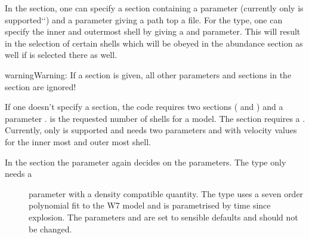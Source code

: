 \documentclass[letterpaper,10pt,english]{sphinxmanual}
\begin{document}
In the  section, one can specify a  section containing a  parameter
(currently only  is supported{}`{}`) and a  parameter giving a path top a file. For the  type,
one can specify the inner and outermost shell by giving a  and  parameter. This will result in
the selection of certain shells which will be obeyed in the abundance section as well if  is selected there as
well.

\begin{notice}{warning}{Warning:}
If a  section is given, all other parameters and sections in the  section are ignored!
\end{notice}

If one doesn't specify a  section, the code requires two sections ( and ) and a
parameter .  is the requested number of shells for a model. The  section
requires a . Currently, only  is supported and needs two parameters  and  with
velocity values for the inner most and outer most shell.
\begin{description}
\item[{In the  section the  parameter again decides on the parameters. The type  only needs a}] \leavevmode
{} parameter with a density compatible quantity. The type  uses a seven order polynomial fit to
the W7 model and is parametrised by time since explosion. The parameters  and  are set
to sensible defaults and should not be changed.

\end{description}
\end{document}
